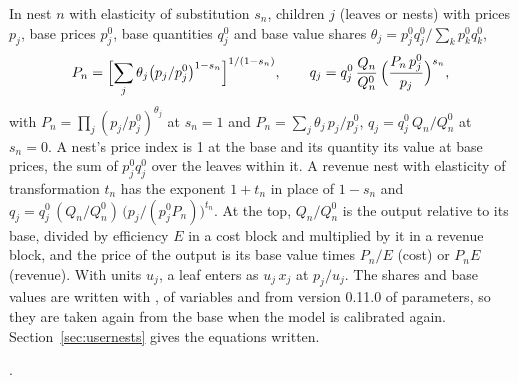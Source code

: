 In nest $n$ with elasticity of substitution $s_n$, children $j$ (leaves or
nests) with prices $p_j$, base prices $p^0_j$, base quantities $q^0_j$ and
base value shares $\theta_j = p^0_j q^0_j / \sum_k p^0_k q^0_k$,
\begin{equation*}
P_n = \Bigl[\sum_j \theta_j \bigl(p_j/p^0_j\bigr)^{1-s_n}\Bigr]^{1/(1-s_n)},
\qquad
q_j = q^0_j\,\frac{Q_n}{Q^0_n}\,\Bigl(\frac{P_n\,p^0_j}{p_j}\Bigr)^{s_n},
\end{equation*}
with $P_n = \prod_j (p_j/p^0_j)^{\theta_j}$ at $s_n = 1$ and
$P_n = \sum_j \theta_j\,p_j/p^0_j$, $q_j = q^0_j\,Q_n/Q^0_n$ at $s_n = 0$. A
nest's price index is 1 at the base and its quantity its value at base
prices, the sum of $p^0_j q^0_j$ over the leaves within it. A revenue nest
with elasticity of transformation $t_n$ has the exponent $1 + t_n$ in place of
$1 - s_n$ and $q_j = q^0_j\,(Q_n/Q^0_n)\,\bigl(p_j/(p^0_j P_n)\bigr)^{t_n}$. At
the top, $Q_n/Q^0_n$ is the output relative to its base, divided by
efficiency $E$ in a cost block and multiplied by it in a revenue block, and
the price of the output is its base value times $P_n/E$ (cost) or $P_n E$
(revenue). With units $u_j$, a leaf enters as $u_j\,x_j$ at $p_j/u_j$. The
shares and base values are written with , of variables and from
version 0.11.0 of parameters, so they are taken again from the base when the
model is calibrated again. Section~\ref{sec:usernests} gives the
equations written.


\citet{rutherford1999}.


\begin{alsosee}
\end{alsosee}
